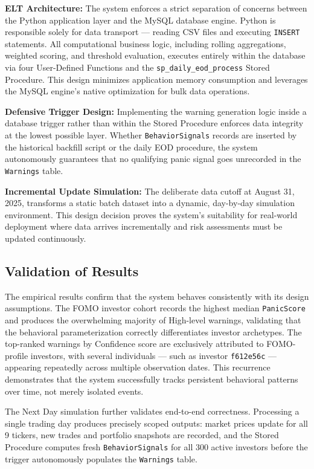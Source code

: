 \textbf{ELT Architecture:} The system enforces a strict separation of concerns between the Python application layer and the MySQL database engine. Python is responsible solely for data transport — reading CSV files and executing \texttt{INSERT} statements. All computational business logic, including rolling aggregations, weighted scoring, and threshold evaluation, executes entirely within the database via four User-Defined Functions and the \texttt{sp\_daily\_eod\_process} Stored Procedure. This design minimizes application memory consumption and leverages the MySQL engine's native optimization for bulk data operations.

\textbf{Defensive Trigger Design:} Implementing the warning generation logic inside a database trigger rather than within the Stored Procedure enforces data integrity at the lowest possible layer. Whether \texttt{BehaviorSignals} records are inserted by the historical backfill script or the daily EOD procedure, the system autonomously guarantees that no qualifying panic signal goes unrecorded in the \texttt{Warnings} table.

\textbf{Incremental Update Simulation:} The deliberate data cutoff at August 31, 2025, transforms a static batch dataset into a dynamic, day-by-day simulation environment. This design decision proves the system's suitability for real-world deployment where data arrives incrementally and risk assessments must be updated continuously.

\subsection{Validation of Results}
The empirical results confirm that the system behaves consistently with its design assumptions. The FOMO investor cohort records the highest median \texttt{PanicScore} and produces the overwhelming majority of High-level warnings, validating that the behavioral parameterization correctly differentiates investor archetypes. The top-ranked warnings by Confidence score are exclusively attributed to FOMO-profile investors, with several individuals — such as investor \texttt{f612e56c} — appearing repeatedly across multiple observation dates. This recurrence demonstrates that the system successfully tracks persistent behavioral patterns over time, not merely isolated events.

The Next Day simulation further validates end-to-end correctness. Processing a single trading day produces precisely scoped outputs: market prices update for all 9 tickers, new trades and portfolio snapshots are recorded, and the Stored Procedure computes fresh \texttt{BehaviorSignals} for all 300 active investors before the trigger autonomously populates the \texttt{Warnings} table.

